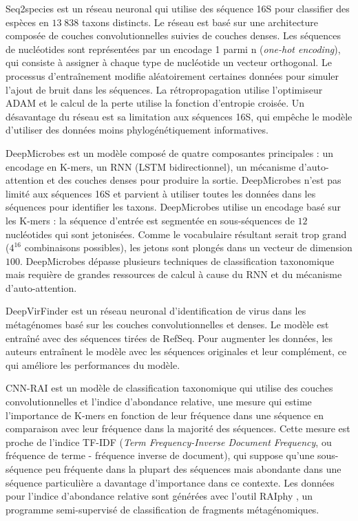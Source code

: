 Seq2species \cite{busia2019} est un réseau neuronal qui utilise des séquence 16S pour classifier des
espèces en $13\;838$ taxons distincts. Le réseau est basé sur une architecture composée de couches
convolutionnelles suivies de couches denses. Les séquences de nucléotides sont représentées par un
encodage 1 parmi n (\textit{one-hot encoding}), qui consiste à assigner à chaque type de nucléotide
un vecteur orthogonal. Le processus d'entraînement modifie aléatoirement certaines données pour
simuler l'ajout de bruit dans les séquences. La rétropropagation utilise l’optimiseur ADAM et le
calcul de la perte utilise la fonction d'entropie croisée. Un désavantage du réseau est sa
limitation aux séquences 16S, qui empêche le modèle d'utiliser des données moins phylogénétiquement
informatives.

DeepMicrobes \cite{liang2020} est un modèle composé de quatre composantes principales : un encodage
en K-mers, un RNN (LSTM bidirectionnel), un mécanisme d'auto-attention et des couches denses pour
produire la sortie. DeepMicrobes n'est pas limité aux séquences 16S et parvient à utiliser toutes
les données dans les séquences pour identifier les taxons. DeepMicrobes utilise un encodage basé sur
les K-mers : la séquence d'entrée est segmentée en sous-séquences de $12$ nucléotides qui sont
jetonisées. Comme le vocabulaire résultant serait trop grand ($4^16$ combinaisons possibles), les
jetons sont plongés dans un vecteur de dimension $100$. DeepMicrobes dépasse plusieurs techniques
de classification taxonomique mais requière de grandes ressources de calcul à cause du RNN et du
mécanisme d'auto-attention.

DeepVirFinder \cite{ren2020} est un réseau neuronal d'identification de virus dans les métagénomes
basé sur les couches convolutionnelles et denses. Le modèle est entraîné avec des séquences tirées
de RefSeq. Pour augmenter les données, les auteurs entraînent le modèle avec les séquences
originales et leur complément, ce qui améliore les performances du modèle.

CNN-RAI \cite{cnnrai2021} est un modèle de classification taxonomique qui utilise des couches
convolutionnelles et l'indice d'abondance relative, une mesure qui estime l'importance de K-mers en
fonction de leur fréquence dans une séquence en comparaison avec leur fréquence dans la majorité des
séquences. Cette mesure est proche de l'indice TF-IDF (\textit{Term Frequency-Inverse Document
Frequency}, ou fréquence de terme - fréquence inverse de document), qui suppose qu'une sous-séquence
peu fréquente dans la plupart des séquences mais abondante dans une séquence particulière a
davantage d'importance dans ce contexte. Les données pour l'indice d'abondance relative sont
générées avec l'outil RAIphy \cite{nalbantoglu11}, un programme semi-supervisé de classification de
fragments métagénomiques.

